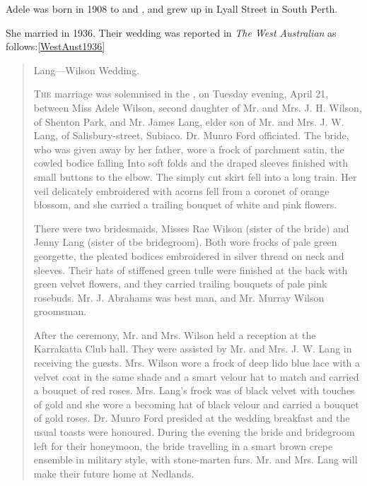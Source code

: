
Adele was born in 1908 to  and ,
and grew up in Lyall Street in South Perth.\cite{rae1}

She married  in 1936.
Their wedding was reported in \emph{The West Australian} as follows:\ref{WestAust1936}

\begin{quotation}
Lang—Wilson Wedding.

\textsc{The} marriage was solemnised in the , on Tuesday evening, April 21, between Miss Adele Wilson,
second daughter of Mr. and Mrs. J. H. Wilson, of Shenton Park, and Mr. James Lang, elder son of Mr. and Mrs. J. W. Lang,
of Salisbury-street, Subiaco. Dr. Munro Ford officiated. The bride, who was given away by her father,
wore a frock of parchment satin, the cowled bodice falling Into soft folds and the draped sleeves finished with small buttons
to the elbow. The simply cut skirt fell into a long train. Her veil delicately embroidered with acorns fell from a
coronet of orange blossom, and she carried a trailing bouquet of white and pink flowers.

There were two bridesmaids, Misses Rae Wilson (sister of the bride) and Jenny Lang (sister of tbe bridegroom).
Both wore frocks of pale green georgette, the pleated bodices embroidered in silver thread on neck and sleeves.
Their hats of stiffened green tulle were finished at the back with green velvet flowers,
and they carried trailing bouquets of pale pink rosebuds.
Mr. J. Abrahams was best man, and Mr. Murray Wilson groomsman.

After the ceremony, Mr. and Mrs. Wilson held a reception at the Karrakatta Club hall.
They were assisted by Mr. and Mrs. J. W. Lang in receiving the guests.
Mrs. Wilson wore a frock of deep lido blue lace with a velvet coat in the same shade and a smart velour hat to match and carried a bouquet of red roses.
Mrs. Lang's frock was of black velvet with touches of gold and she wore a becoming hat of black velour and carried a bouquet of gold roses.
Dr. Munro Ford presided at the wedding breakfast and the usual toasts were honoured.
During the evening the bride and bridegroom left for their honeymoon, the bride travelling in a smart brown crepe ensemble in military style,
with stone-marten furs. Mr. and Mrs. Lang will make their future home at Nedlands.
\end{quotation}
